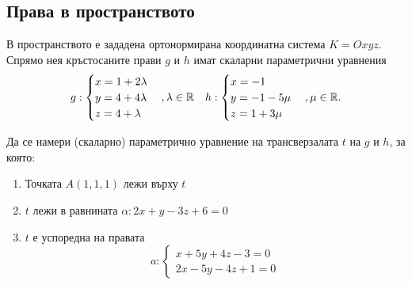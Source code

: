 \documentclass[numbers=endperiod, DIV=15]{scrartcl}
\begin{document}
\subsection{Права в пространството}

\begin{exercise}
  В пространството е зададена ортонормирана координатна система $K = Oxyz$. Спрямо нея кръстосаните прави $g$ и $h$ имат скаларни параметрични уравнения
  \begin{align*}
    g: \begin{cases}
      x = 1 + 2\lambda \\
      y = 4 + 4\lambda \\
      z = 4 + \lambda
    \end{cases},
    \lambda \in \mathbb{R}
    &&
    h: \begin{cases}
      x = -1 \\
      y = -1 - 5\mu \\
      z = 1 + 3\mu
    \end{cases},
    \mu \in \mathbb{R}.
  \end{align*}

  Да се намери (скаларно) параметрично уравнение на трансверзалата $t$ на $g$ и $h$, за която:
  \begin{enumerate}[label=\alph*)]
    \item Точката $A(1, 1, 1)$ лежи върху $t$
    \item $t$ лежи в равнината $\alpha: 2x + y - 3z + 6 = 0$
    \item $t$ е успоредна на правата
    \begin{displaymath}
      a: \begin{cases}
        x + 5y + 4z - 3 = 0 \\
        2x - 5y - 4z + 1 = 0
      \end{cases}
    \end{displaymath}
  \end{enumerate}
\end{exercise}
\end{document}
